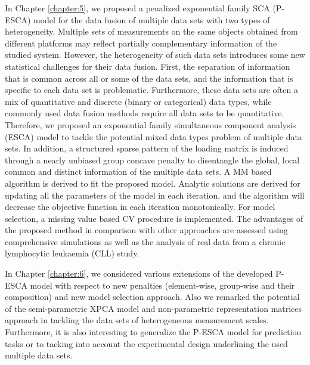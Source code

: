 In Chapter \ref{chapter:5}, we proposed a penalized exponential family SCA (P-ESCA) model for the data fusion of multiple data sets with two types of heterogeneity. Multiple sets of measurements on the same objects obtained from different platforms may reflect partially complementary information of the studied system. However, the heterogeneity of such data sets introduces some new statistical challenges for their data fusion. First, the separation of information that is common across all or some of the data sets, and the information that is specific to each data set is problematic. Furthermore, these data sets are often a mix of quantitative and discrete (binary or categorical) data types, while commonly used data fusion methods require all data sets to be quantitative. Therefore, we proposed an exponential family simultaneous component analysis (ESCA) model to tackle the potential mixed data types problem of multiple data sets. In addition, a structured sparse pattern of the loading matrix is induced through a nearly unbiased group concave penalty to disentangle the global, local common and distinct information of the multiple data sets. A MM based algorithm is derived to fit the proposed model. Analytic solutions are derived for updating all the parameters of the model in each iteration, and the algorithm will decrease the objective function in each iteration monotonically. For model selection, a missing value based CV procedure is implemented. The advantages of the proposed method in comparison with other approaches are assessed using comprehensive simulations as well as the analysis of real data from a chronic lymphocytic leukaemia (CLL) study.

In Chapter \ref{chapter:6}, we considered various extensions of the developed P-ESCA model with respect to new penalties (element-wise, group-wise and their composition) and new model selection approach. Also we remarked the potential of the semi-parametric XPCA model and non-parametric representation matrices approach in tackling the data sets of heterogeneous measurement scales. Furthermore, it is also interesting to generalize the P-ESCA model for prediction tasks or to tacking into account the experimental design underlining the used multiple data sets.



